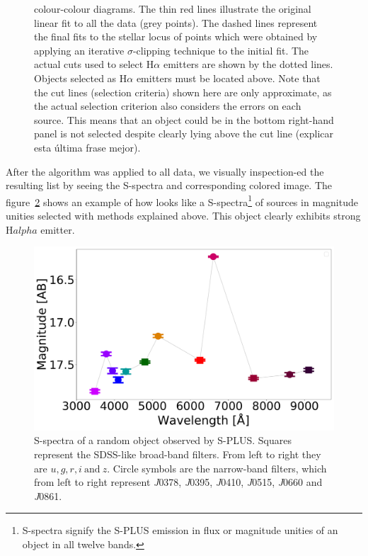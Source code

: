 \documentclass[fleqn,usenatbib]{mnras}
\begin{document}
\begin{figure}
{    colour-colour diagrams. The thin red lines illustrate the original linear
    fit to all the data (grey points). The dashed lines represent the final
    fits to the stellar locus of points which were obtained by applying an iterative
    $\sigma$-clipping technique to the initial fit. The actual cuts used to select H{$\alpha$}
    emitters are shown by the dotted lines. Objects selected as H{$\alpha$} emitters
    must be located above. Note that the cut lines (selection criteria) shown here
    are only approximate, as the actual selection criterion also considers the errors on
    each source. This means that an object could be in the bottom
    right-hand panel is not selected despite clearly lying above the cut line
    ({\sc explicar esta última frase mejor}).}
  \label{fig:criteria-color-plot}
\end{figure}

After the algorithm was applied to all data, we visually inspection-ed the
resulting list by seeing the S-spectra and corresponding colored image.
The figure~\ref{fig:Spectra} shows an example of how looks like a
S-spectra\footnote{S-spectra signify the S-PLUS emission in flux
or magnitude unities of an object in all twelve bands.} of sources in
magnitude unities selected with methods explained above. This object
clearly exhibits strong H$alpha$ emitter.

\begin{figure}
\includegraphics[width=0.9\linewidth]{Figs/photopectrum_splus_SPLUS-n15s22-024043_Good-LD-Halpha-DR3_noFlag_merge-takeoutbad-Final_PStotal.pdf}
\centering
{}
\caption{S-spectra of a random object observed by S-PLUS. Squares represent
  the SDSS-like broad-band filters. From left to right they are \(u, g, r,
  i~\text{and}~ z\). Circle symbols are the narrow-band filters, which from
  left to right represent \textit{J}0378, \textit{J}0395, \textit{J}0410,
  \textit{J}0515, \textit{J}0660 and \textit{J}0861.}
\label{fig:Spectra}
\end{figure}
\end{document}
